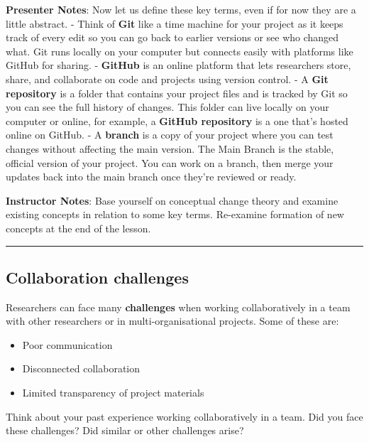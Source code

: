 \documentclass[
  letterpaper,
  DIV=11,
  numbers=noendperiod]{scrartcl}
\providecommand{\tightlist}{%
  \setlength{\itemsep}{0pt}\setlength{\parskip}{0pt}}
\begin{document}
\textbf{Presenter Notes}: Now let us define these key terms, even if for
now they are a little abstract. - Think of \textbf{Git} like a time
machine for your project as it keeps track of every edit so you can go
back to earlier versions or see who changed what. Git runs locally on
your computer but connects easily with platforms like GitHub for
sharing. - \textbf{GitHub} is an online platform that lets researchers
store, share, and collaborate on code and projects using version
control. - A \textbf{Git repository} is a folder that contains your
project files and is tracked by Git so you can see the full history of
changes. This folder can live locally on your computer or online, for
example, a \textbf{GitHub repository} is a one that's hosted online on
GitHub. - A \textbf{branch} is a copy of your project where you can test
changes without affecting the main version. The Main Branch is the
stable, official version of your project. You can work on a branch, then
merge your updates back into the main branch once they're reviewed or
ready.

\textbf{Instructor Notes}: Base yourself on conceptual change theory and
examine existing concepts in relation to some key terms. Re-examine
formation of new concepts at the end of the lesson.

\begin{center}\rule{0.5\linewidth}{0.5pt}\end{center}

\subsection{Collaboration challenges}\label{collaboration-challenges}

Researchers can face many \textbf{challenges} when working
collaboratively in a team with other researchers or in
multi-organisational projects. Some of these are:

\begin{itemize}
\tightlist
\item
  Poor communication
\item
  Disconnected collaboration
\item
  Limited transparency of project materials
\end{itemize}

\begin{tcolorbox}[enhanced jigsaw, arc=.35mm, bottomrule=.15mm, bottomtitle=1mm, breakable, colback=white, colbacktitle=quarto-callout-tip-color!10!white, colframe=quarto-callout-tip-color-frame, coltitle=black, left=2mm, leftrule=.75mm, opacityback=0, opacitybacktitle=0.6, rightrule=.15mm, title=\textcolor{quarto-callout-tip-color}{\faLightbulb}\hspace{0.5em}{Sound familiar?}, titlerule=0mm, toprule=.15mm, toptitle=1mm]

Think about your past experience working collaboratively in a team. Did
you face these challenges? Did similar or other challenges arise?

\end{tcolorbox}
\end{document}
